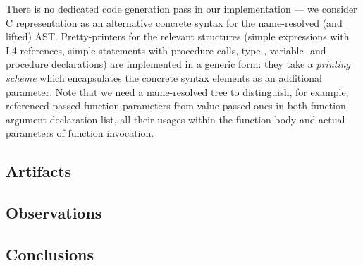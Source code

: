 There is no dedicated code generation pass in our implementation --- we consider C representation
as an alternative concrete syntax for the name-resolved (and lifted) AST. Pretty-printers for the relevant
structures (simple expressions with L4 references, simple statements with procedure calls, 
type-, variable- and procedure declarations) are implemented in a generic form: they take a
\emph{printing scheme} which encapsulates the concrete syntax elements as an additional
parameter. Note that we need a name-resolved tree to distinguish, for example, referenced-passed
function parameters from value-passed ones in both function argument declaration list, all
their usages within the function body and actual parameters of function invocation.

\subsection{Artifacts}

\subsection{Observations}

\subsection{Conclusions}
